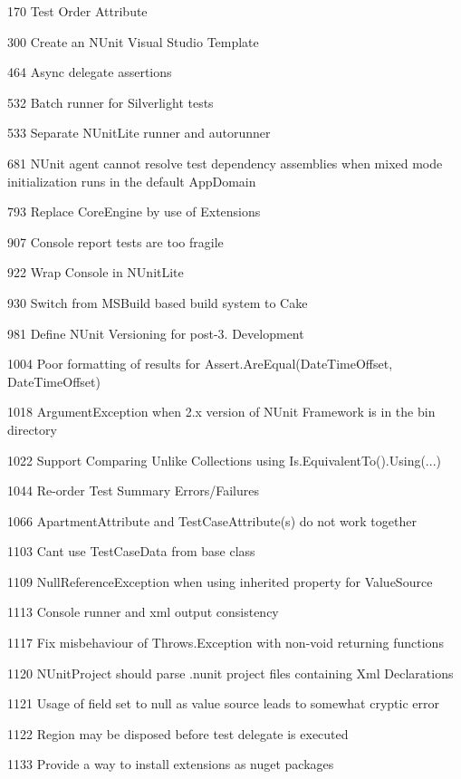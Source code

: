 \begin{DoxyItemize}
\item 170 Test Order Attribute
\item 300 Create an N\+Unit Visual Studio Template
\item 464 Async delegate assertions
\item 532 Batch runner for Silverlight tests
\item 533 Separate N\+Unit\+Lite runner and autorunner
\item 681 N\+Unit agent cannot resolve test dependency assemblies when mixed mode initialization runs in the default App\+Domain
\item 793 Replace Core\+Engine by use of Extensions
\item 907 Console report tests are too fragile
\item 922 Wrap Console in N\+Unit\+Lite
\item 930 Switch from M\+S\+Build based build system to Cake
\item 981 Define N\+Unit Versioning for post-\/3. Development
\item 1004 Poor formatting of results for Assert.\+Are\+Equal(\+Date\+Time\+Offset, Date\+Time\+Offset)
\item 1018 Argument\+Exception when 2.\+x version of N\+Unit Framework is in the bin directory
\item 1022 Support Comparing Unlike Collections using Is.\+Equivalent\+To().Using(...)
\item 1044 Re-\/order Test Summary Errors/\+Failures
\item 1066 Apartment\+Attribute and Test\+Case\+Attribute(s) do not work together
\item 1103 Can\textquotesingle{}t use Test\+Case\+Data from base class
\item 1109 Null\+Reference\+Exception when using inherited property for Value\+Source
\item 1113 Console runner and xml output consistency
\item 1117 Fix misbehaviour of Throws.\+Exception with non-\/void returning functions
\item 1120 N\+Unit\+Project should parse .nunit project files containing Xml Declarations
\item 1121 Usage of field set to null as value source leads to somewhat cryptic error
\item 1122 Region may be disposed before test delegate is executed
\item 1133 Provide a way to install extensions as nuget packages

\end{DoxyItemize}
